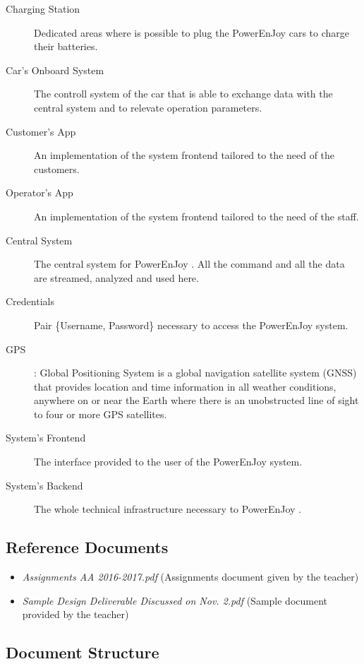 \documentclass[11pt]{article} %
\newcommand{\pe}{PowerEnJoy }
\begin{document}
\begin{description}
	\item[Charging Station] Dedicated areas where is possible to plug the \pe cars to charge their batteries.
	\item[Car's Onboard System] The controll system of the car that is able to exchange data with the central system and to relevate operation parameters.
	\item[Customer's App] An implementation of the system frontend tailored to the need of the customers.
	\item[Operator's App] An implementation of the system frontend tailored to the need of the staff.
	\item[Central System] The central system for \pe. All the command and all the data are streamed, analyzed and used here.
	\item[Credentials] Pair \{Username, Password\} necessary to access the \pe system.
  	\item[GPS]: Global Positioning System is a global navigation satellite system (GNSS) that provides location and time information in all weather conditions, anywhere on or near the Earth where there is an unobstructed line of sight to four or more GPS satellites.
  	\item[System's Frontend] The interface provided to the user of the \pe system. 
  	\item[System's Backend]  The whole technical infrastructure necessary to \pe.
  \end{description}

\subsection{Reference Documents}
\begin{itemize}
	\item \textit{Assignments AA 2016-2017.pdf} (Assignments document given by the teacher)
	\item \textit{Sample Design Deliverable Discussed on Nov. 2.pdf} (Sample document provided by the teacher)
  \end{itemize}

\subsection{Document Structure}
\end{document}
